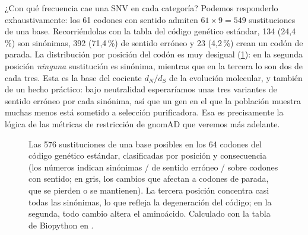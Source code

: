 ¿Con qué frecuencia cae una SNV en cada categoría? Podemos responderlo exhaustivamente: los 61 codones con sentido admiten $61\times 9=549$ sustituciones de una base. Recorriéndolas con la tabla del código genético estándar, 134 (24,4\,\%) son sinónimas, 392 (71,4\,\%) de sentido erróneo y 23 (4,2\,\%) crean un codón de parada. La distribución por posición del codón es muy desigual (\cref{fig:09-snvcod}): en la segunda posición \emph{ninguna} sustitución es sinónima, mientras que en la tercera lo son dos de cada tres. Esta es la base del cociente $d_N/d_S$ de la evolución molecular, y también de un hecho práctico: bajo neutralidad esperaríamos unas tres variantes de sentido erróneo por cada sinónima, así que un gen en el que la población muestra muchas menos está sometido a selección purificadora. Esa es precisamente la lógica de las métricas de restricción de gnomAD que veremos más adelante.

\begin{figure}[t]
\centering
{}
\caption[Consecuencias de todas las SNV posibles]{Las 576 sustituciones de una base posibles en los 64 codones del código genético estándar, clasificadas por posición y consecuencia (los números indican sinónimas / de sentido erróneo /  sobre codones con sentido; en gris, los cambios que afectan a codones de parada, que se pierden o se mantienen). La tercera posición concentra casi todas las sinónimas, lo que refleja la degeneración del código; en la segunda, todo cambio altera el aminoácido. Calculado con la tabla de Biopython en .}
\label{fig:09-snvcod}
\end{figure}

